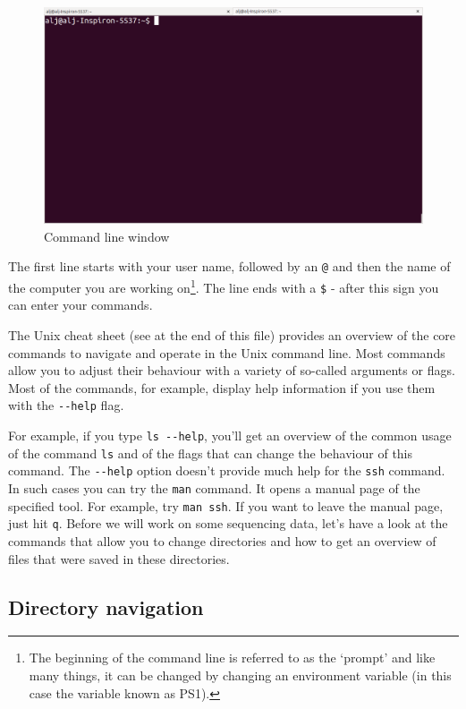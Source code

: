 \documentclass[11pt]{article}
\begin{document}
\begin{figure}[htb]
\centering
\includegraphics[width=14cm]{Terminal.png}
\caption{Command line window}
\end{figure}

The first line starts with your user name, followed by an \texttt{@} and then
the name of the computer you are working on\footnote{The beginning of the command line is referred to as the `prompt' and
like many things, it can be changed by
changing an environment variable (in this case the variable known as PS1).
 }. The line ends with a
\texttt{\$} - after this sign you can enter your commands.

The Unix cheat sheet (see at the end of this file) provides an
overview of the core commands to navigate and operate in the Unix
command line. Most commands allow you to adjust their behaviour with a
variety of so-called arguments or flags. Most of the commands, for
example, display help information if you use them with the \texttt{-{}-help}
flag.

For example, if you type \texttt{ls -{}-help}, you'll get an overview of the
common usage of the command \texttt{ls} and of the flags that can change the
behaviour of this command.  The \texttt{-{}-help} option doesn't provide much
help for the \texttt{ssh} command. In such cases you can try the \texttt{man}
command. It opens a manual page of the specified tool. For example,
try \texttt{man ssh}. If you want to leave the manual page, just hit \texttt{q}.
Before we will work on some sequencing data, let's have a look
at the commands that allow you to change directories and how to get an
overview of files that were saved in these directories.
\subsection{Directory navigation}
\label{sec-2-1}
\end{document}
